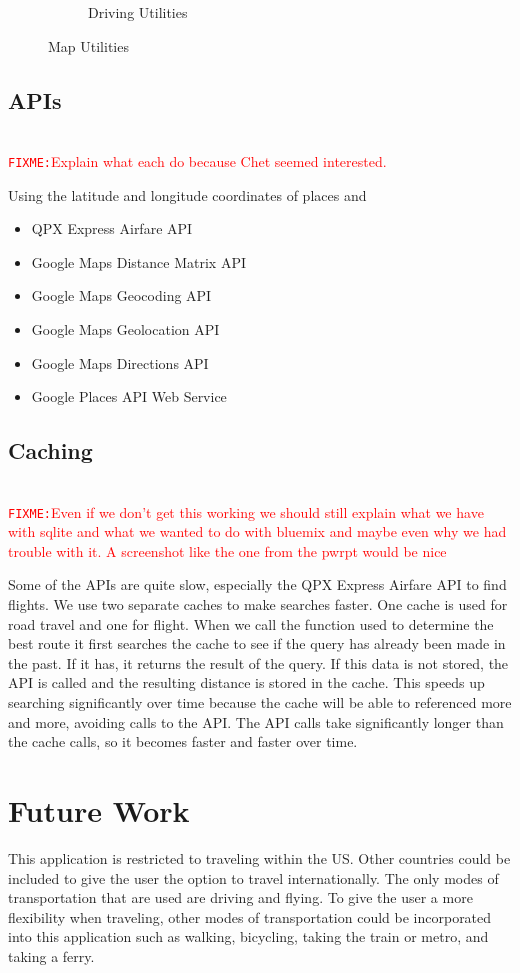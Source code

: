 \documentclass[11pt]{article}
\newcommand{\FIXME}[1]{ \ \\ \hspace* {-1.5 cm}
  \textcolor{red}{\texttt{FIXME:}#1} \medskip\par}
\begin{document}
\begin{figure}
\begin{subfigure}{.6\textwidth}
  \caption{Driving Utilities}
  \label{fig:drivuml}
\end{subfigure}
\caption{Map Utilities}
\label{fig:util}
\end{figure}

\subsection{APIs}

\FIXME{Explain what each do because Chet seemed interested.}

Using the latitude and longitude coordinates of places and 

\begin{itemize}
\item QPX Express Airfare API
\item Google Maps Distance Matrix API
\item Google Maps Geocoding API
\item Google Maps Geolocation API
\item Google Maps Directions API
\item Google Places API Web Service
\end{itemize}

\subsection{Caching}
\FIXME{Even if we don't get this working we should still explain what we have with sqlite and what we wanted to do with bluemix and maybe even why we had trouble with it. A screenshot like the one from the pwrpt would be nice}

Some of the APIs are quite slow, especially the QPX Express Airfare API to find flights. 
We use two separate caches to make searches faster. One cache is used for road travel and one for flight. When we call the function used to determine the best route it first searches the cache to see if the query has already been made in the past. If it has, it returns the result of the query. If this data is not stored, the API is called and the resulting distance is stored in the cache. This speeds up searching significantly over time because the cache will be able to referenced more and more, avoiding calls to the API. The API calls take significantly longer than the cache calls, so it becomes faster and faster over time. 

\section{Future Work}
This application is restricted to traveling within the US. Other countries could be included to give the user the option to travel internationally. The only modes of transportation that are used are driving and flying. To give the user a more flexibility when traveling, other modes of transportation could be incorporated into this application such as walking, bicycling, taking the train or metro, and taking a ferry.
\end{document}
